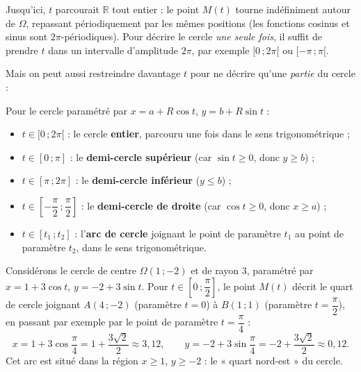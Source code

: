 \documentclass[11pt]{article}
\begin{document}
Jusqu'ici, $t$ parcourait $\mathbb{R}$ tout entier : le point $M(t)$ tourne indéfiniment autour de $\Omega$, repassant périodiquement par les mêmes positions (les fonctions cosinus et sinus sont $2\pi$-périodiques). Pour décrire le cercle \emph{une seule fois}, il suffit de prendre $t$ dans un intervalle d'amplitude $2\pi$, par exemple $[0\,;2\pi[$ ou $[-\pi\,;\pi[$.

Mais on peut aussi restreindre davantage $t$ pour ne décrire qu'une \emph{partie} du cercle :

\begin{aretenir}
Pour le cercle paramétré par $x=a+R\cos t$, $y=b+R\sin t$ :
\begin{itemize}
\item $t\in[0\,;2\pi[$ : le cercle \textbf{entier}, parcouru une fois dans le sens trigonométrique ;
\item $t\in[0\,;\pi]$ : le \textbf{demi-cercle supérieur} (car $\sin t\geq 0$, donc $y\geq b$) ;
\item $t\in[\pi\,;2\pi]$ : le \textbf{demi-cercle inférieur} ($y\leq b$) ;
\item $t\in\left[-\dfrac{\pi}{2}\,;\dfrac{\pi}{2}\right]$ : le \textbf{demi-cercle de droite} (car $\cos t\geq 0$, donc $x\geq a$) ;
\item $t\in[t_1\,;t_2]$ : l'\textbf{arc de cercle} joignant le point de paramètre $t_1$ au point de paramètre $t_2$, dans le sens trigonométrique.
\end{itemize}
\end{aretenir}

\begin{exemplebox}
Considérons le cercle de centre $\Omega(1\,;-2)$ et de rayon $3$, paramétré par $x=1+3\cos t$, $y=-2+3\sin t$. Pour $t\in\left[0\,;\dfrac{\pi}{2}\right]$, le point $M(t)$ décrit le quart de cercle joignant $A(4\,;-2)$ (paramètre $t=0$) à $B(1\,;1)$ (paramètre $t=\dfrac{\pi}{2}$), en passant par exemple par le point de paramètre $t=\dfrac{\pi}{4}$ :
\[
x = 1+3\cos\frac{\pi}{4} = 1+\frac{3\sqrt{2}}{2}\approx 3{,}12, \qquad
y = -2+3\sin\frac{\pi}{4} = -2+\frac{3\sqrt{2}}{2}\approx 0{,}12.
\]
Cet arc est situé dans la région $x\geq 1$, $y\geq -2$ : le « quart nord-est » du cercle.
\end{exemplebox}
\end{document}
